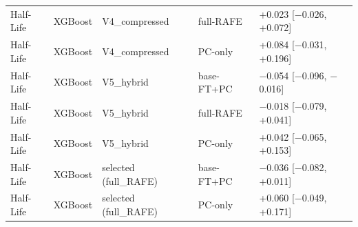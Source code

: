 \begin{longtable}{lllp{2.6cm}p{4.2cm}}
Half-Life & XGBoost & V4\_compressed & full-RAFE & +0.023 [$-$0.026, +0.072] \\
Half-Life & XGBoost & V4\_compressed & PC-only & +0.084 [$-$0.031, +0.196] \\
Half-Life & XGBoost & V5\_hybrid & base-FT+PC & $-$0.054 [$-$0.096, $-$0.016] \\
Half-Life & XGBoost & V5\_hybrid & full-RAFE & $-$0.018 [$-$0.079, +0.041] \\
Half-Life & XGBoost & V5\_hybrid & PC-only & +0.042 [$-$0.065, +0.153] \\
Half-Life & XGBoost & selected (full\_RAFE) & base-FT+PC & $-$0.036 [$-$0.082, +0.011] \\
Half-Life & XGBoost & selected (full\_RAFE) & PC-only & +0.060 [$-$0.049, +0.171] \\
\end{longtable}
